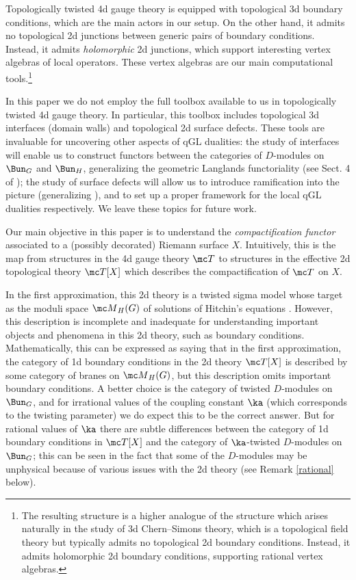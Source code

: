 \documentclass[11pt,reqno]{amsart}
\theoremstyle{plain}
\numberwithin{equation}{section}
\theoremstyle{definition}
\begin{document}
Topologically twisted 4d gauge theory is equipped with topological 3d
boundary conditions, which are the main actors in our setup. On the
other hand, it admits no topological 2d junctions between generic
pairs of boundary conditions. Instead, it admits {\it holomorphic} 2d
junctions, which support interesting vertex algebras of local
operators. These vertex algebras are our main computational
tools.\footnote{The resulting structure is a higher analogue of the
  structure which arises naturally in the study of 3d Chern--Simons
  theory, which is a topological field theory but typically admits no
  topological 2d boundary conditions. Instead, it admits holomorphic
  2d boundary conditions, supporting rational vertex algebras. }

In this paper we do not employ the full toolbox available to us in
topologically twisted 4d gauge theory. In particular, this toolbox
includes topological 3d interfaces (domain walls) and topological 2d
surface defects. These tools are invaluable for uncovering other
aspects of qGL dualities: the study of interfaces will enable us to
construct functors between the categories of $D$-modules on $\Bun_G$
and $\Bun_H$, generalizing the geometric Langlands functoriality (see
Sect. 4 of \cite{F:AMS}); the study of surface defects will allow us
to introduce ramification into the picture (generalizing \cite{GW}),
and to set up a proper framework for the local qGL dualities
respectively. We leave these topics for future work.

Our main objective in this paper is to understand the {\em
  compactification functor} associated to a (possibly decorated)
Riemann surface $X$. Intuitively, this is the map from structures in
the 4d gauge theory ${\mc T}$ to structures in the effective 2d
topological theory ${\mc T}[X]$ which describes the compactification
of ${\mc T}$ on $X$.

In the first approximation, this 2d theory is a twisted sigma model
whose target as the moduli space ${\mc M}_H(G)$ of solutions of
Hitchin's equations \cite{Hit}. However, this description is
incomplete and inadequate for understanding important objects and
phenomena in this 2d theory, such as boundary
conditions. Mathematically, this can be expressed as saying that in
the first approximation, the category of 1d boundary conditions in the
2d theory ${\mc T}[X]$ is described by some category of branes on
${\mc M}_H(G)$, but this description omits important boundary
conditions. A better choice is the category of twisted $D$-modules on
$\Bun_G$, and for irrational values of the coupling constant $\ka$ (which
corresponds to the twisting parameter) we do expect this to be the
correct answer. But for rational values of $\ka$ there are subtle
differences between the category of 1d boundary conditions in ${\mc
  T}[X]$ and the category of $\ka$-twisted $D$-modules on $\Bun_G$;
this can be seen in the fact that some of the $D$-modules may be
unphysical because of various issues with the 2d theory (see Remark
\ref{rational} below).
\end{document}
